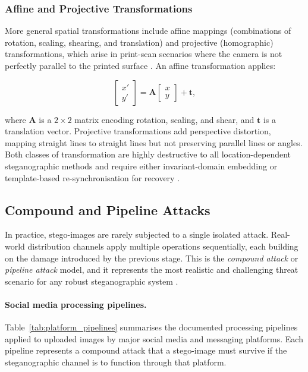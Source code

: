 \documentclass[12pt,a4paper,oneside]{report}
\begin{document}
	\subsubsection{Affine and Projective Transformations}
	
	More general spatial transformations include affine mappings (combinations of rotation, scaling,
	shearing, and translation) and projective (homographic) transformations, which arise in
	print-scan scenarios where the camera is not perfectly parallel to the printed surface
	\cite{kutter1999digital}. An affine transformation applies:
	
	\begin{equation}
		\begin{bmatrix} x' \\ y' \end{bmatrix}
		=
		\mathbf{A}
		\begin{bmatrix} x \\ y \end{bmatrix}
		+ \mathbf{t},
		\label{eq:affine}
	\end{equation}
	
	where $\mathbf{A}$ is a $2\times2$ matrix encoding rotation, scaling, and shear, and $\mathbf{t}$
	is a translation vector. Projective transformations add perspective distortion, mapping straight
	lines to straight lines but not preserving parallel lines or angles. Both classes of
	transformation are highly destructive to all location-dependent steganographic methods and require
	either invariant-domain embedding or template-based re-synchronisation for recovery
	\cite{cox2007digital}.
	
	\subsection{Compound and Pipeline Attacks}
	\label{subsec:compound_attacks}
	
	In practice, stego-images are rarely subjected to a single isolated attack. Real-world
	distribution channels apply multiple operations sequentially, each building on the damage
	introduced by the previous stage. This is the \emph{compound attack} or \emph{pipeline attack}
	model, and it represents the most realistic and challenging threat scenario for any robust
	steganographic system \cite{petitcolas1999information}.
	
	\paragraph{Social media processing pipelines.}
	Table~\ref{tab:platform_pipelines} summarises the documented processing pipelines applied to
	uploaded images by major social media and messaging platforms. Each pipeline represents a
	compound attack that a stego-image must survive if the steganographic channel is to function
	through that platform.
	
\end{document}
